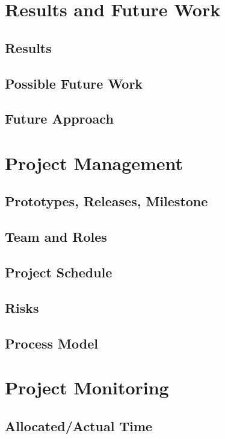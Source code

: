\documentclass[a4paper,parskip=full]{scrreprt}
\begin{document}
\chapter{Results and Future Work}
\section{Results}
\section{Possible Future Work}
\section{Future Approach}

\chapter{Project Management}
\section{Prototypes, Releases, Milestone}
\section{Team and Roles}
\section{Project Schedule}
\section{Risks}
\section{Process Model}

\chapter{Project Monitoring}
\section{Allocated/Actual Time}
\end{document}
